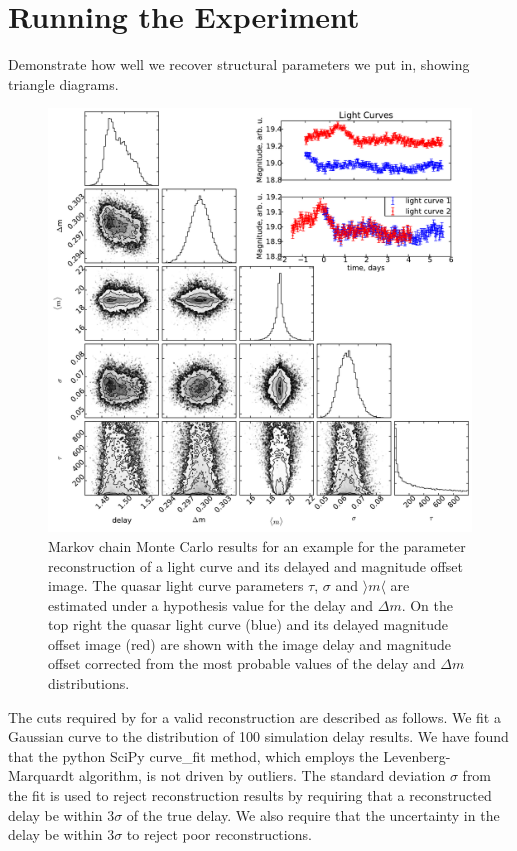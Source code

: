 \documentclass{emulateapj}
\begin{document}
\section{Running the Experiment}\label{}

Demonstrate how well we recover structural parameters we put in, showing triangle diagrams.


\begin{figure}[t]
\begin{center}
\includegraphics[width=\linewidth]{./triangle_example.pdf}
\caption{Markov chain Monte Carlo results for an example for the parameter reconstruction of a light curve and its delayed and magnitude offset image. The quasar light curve parameters $\tau$, $\sigma$ and $\rangle m \langle$ are estimated under a hypothesis value for the delay and $\Delta m$. On the top right the quasar light curve (blue) and its delayed magnitude offset image (red) are shown with the image delay and magnitude offset corrected from the most probable values of the delay and $\Delta m$ distributions.}\label{fig:volume}
\end{center}
\end{figure}


The cuts required by for a valid reconstruction are described as follows. We fit a Gaussian curve to the distribution of 100 simulation delay results. We have found that the python SciPy curve\_fit method, which employs the Levenberg-Marquardt algorithm, is not driven by outliers. The standard deviation $\sigma$ from the fit is used to reject reconstruction results by requiring that a reconstructed delay be within 3$\sigma$ of the true delay. We also require that the uncertainty in the delay be within 3$\sigma$ to reject poor reconstructions.
\end{document}
